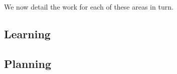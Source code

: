 \documentclass[a4paper,11pt,pdf]{pacmanreport}
\begin{document}
We now detail the work for each of these areas in turn.





\subsection{Learning}










\subsection{Planning}




\end{document}
